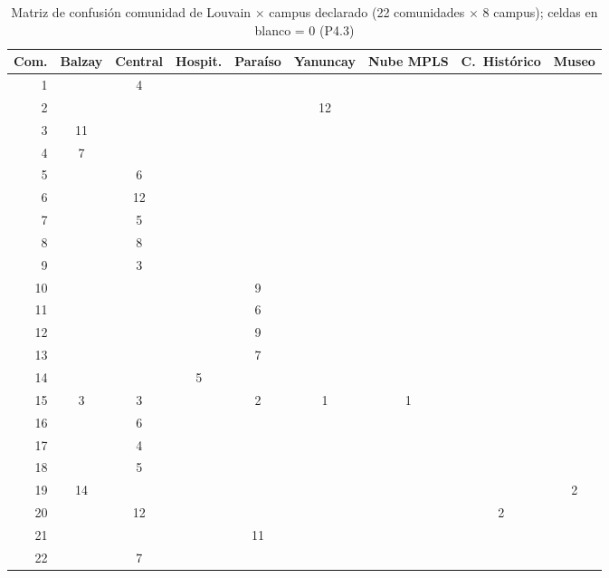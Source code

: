 \documentclass[10pt,a4paper]{extarticle}
\begin{document}
\begin{table}[H]
\centering
\caption{Matriz de confusión comunidad de Louvain $\times$ campus declarado (22 comunidades $\times$ 8 campus); celdas en blanco = 0 (P4.3)}
\label{tab:confusion}
\scriptsize
\begin{adjustbox}{max width=\textwidth}
\begin{tabular}{rcccccccc}
\toprule
\textbf{Com.} & \textbf{Balzay} & \textbf{Central} & \textbf{Hospit.} & \textbf{Paraíso} & \textbf{Yanuncay} & \textbf{Nube MPLS} & \textbf{C.\ Histórico} & \textbf{Museo} \\
\midrule
1  &    & 4  &   &   &   &   &   &   \\
2  &    &    &   &   & 12 &   &   &   \\
3  & 11 &    &   &   &   &   &   &   \\
4  & 7  &    &   &   &   &   &   &   \\
5  &    & 6  &   &   &   &   &   &   \\
6  &    & 12 &   &   &   &   &   &   \\
7  &    & 5  &   &   &   &   &   &   \\
8  &    & 8  &   &   &   &   &   &   \\
9  &    & 3  &   &   &   &   &   &   \\
10 &    &    &   & 9 &   &   &   &   \\
11 &    &    &   & 6 &   &   &   &   \\
12 &    &    &   & 9 &   &   &   &   \\
13 &    &    &   & 7 &   &   &   &   \\
14 &    &    & 5 &   &   &   &   &   \\
15 & 3  & 3  &   & 2 & 1 & 1 &   &   \\
16 &    & 6  &   &   &   &   &   &   \\
17 &    & 4  &   &   &   &   &   &   \\
18 &    & 5  &   &   &   &   &   &   \\
19 & 14 &    &   &   &   &   &   & 2 \\
20 &    & 12 &   &   &   &   & 2 &   \\
21 &    &    &   & 11 &   &   &   &   \\
22 &    & 7  &   &   &   &   &   &   \\
\bottomrule
\end{tabular}
\end{adjustbox}
\end{table}
\end{document}
